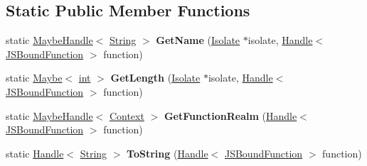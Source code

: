 \subsection*{Static Public Member Functions}
\begin{DoxyCompactItemize}
\item 
\mbox{\label{classv8_1_1internal_1_1JSBoundFunction_abfe268881f314599a7df612a13a2686a}} 
static \mbox{\hyperlink{classv8_1_1internal_1_1MaybeHandle}{Maybe\+Handle}}$<$ \mbox{\hyperlink{classv8_1_1internal_1_1String}{String}} $>$ {\bfseries Get\+Name} (\mbox{\hyperlink{classv8_1_1internal_1_1Isolate}{Isolate}} $\ast$isolate, \mbox{\hyperlink{classv8_1_1internal_1_1Handle}{Handle}}$<$ \mbox{\hyperlink{classv8_1_1internal_1_1JSBoundFunction}{J\+S\+Bound\+Function}} $>$ function)
\item 
\mbox{\label{classv8_1_1internal_1_1JSBoundFunction_ab01e21aa219540ac975f162c44c07921}} 
static \mbox{\hyperlink{classv8_1_1Maybe}{Maybe}}$<$ \mbox{\hyperlink{classint}{int}} $>$ {\bfseries Get\+Length} (\mbox{\hyperlink{classv8_1_1internal_1_1Isolate}{Isolate}} $\ast$isolate, \mbox{\hyperlink{classv8_1_1internal_1_1Handle}{Handle}}$<$ \mbox{\hyperlink{classv8_1_1internal_1_1JSBoundFunction}{J\+S\+Bound\+Function}} $>$ function)
\item 
\mbox{\label{classv8_1_1internal_1_1JSBoundFunction_a8e212c3a1099155f0086edcf13899c21}} 
static \mbox{\hyperlink{classv8_1_1internal_1_1MaybeHandle}{Maybe\+Handle}}$<$ \mbox{\hyperlink{classv8_1_1internal_1_1Context}{Context}} $>$ {\bfseries Get\+Function\+Realm} (\mbox{\hyperlink{classv8_1_1internal_1_1Handle}{Handle}}$<$ \mbox{\hyperlink{classv8_1_1internal_1_1JSBoundFunction}{J\+S\+Bound\+Function}} $>$ function)
\item 
\mbox{\label{classv8_1_1internal_1_1JSBoundFunction_a0f16413d1796af697a95e2d736e8cfc0}} 
static \mbox{\hyperlink{classv8_1_1internal_1_1Handle}{Handle}}$<$ \mbox{\hyperlink{classv8_1_1internal_1_1String}{String}} $>$ {\bfseries To\+String} (\mbox{\hyperlink{classv8_1_1internal_1_1Handle}{Handle}}$<$ \mbox{\hyperlink{classv8_1_1internal_1_1JSBoundFunction}{J\+S\+Bound\+Function}} $>$ function)
\end{DoxyCompactItemize}
